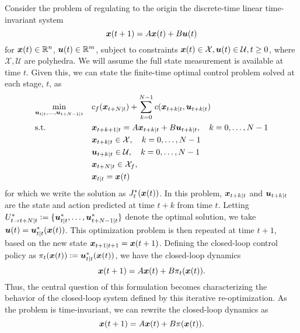 Consider the problem of regulating to the origin the discrete-time linear time-invariant system
\begin{equation}
    \bm{x}(t+1) = A \bm{x}(t) + B \bm{u}(t)
\end{equation}
for $\bm{x}(t) \in \mathbb{R}^n$, $\bm{u}(t) \in \mathbb{R}^m$, subject to constraints $\bm{x}(t) \in \mathcal{X}, \bm{u}(t) \in \mathcal{U}, t \geq 0$, where $\mathcal{X}, \mathcal{U}$ are polyhedra. We will assume the full state measurement is available at time $t$. 
Given this, we can state the finite-time optimal control problem solved at each stage, $t$, as 
\begin{equation}
\begin{aligned}
\label{eq:ocp}
& \underset{\bm{u}_{t\mid t}, \ldots, \bm{u}_{t+N-1\mid t}}{\min} & & c_f(\bm{x}_{t+N\mid t}) + \sum_{k=0}^{N-1} c(\bm{x}_{t+k\mid t},\bm{u}_{t+k\mid t})  \\
& \textrm{s.t.} & & \bm{x}_{t+k+1\mid t} = A \bm{x}_{t+k\mid t} + B \bm{u}_{t+k\mid t}, \quad k = 0, \ldots, N-1 \\
& & & \bm{x}_{t+k\mid t} \in \mathcal{X},  \quad k = 0, \ldots, N-1 \\
& & & \bm{u}_{t+k\mid t} \in \mathcal{U},  \quad k = 0, \ldots, N-1 \\
& & & \bm{x}_{t+N\mid t} \in \mathcal{X}_f, \\
& & & \bm{x}_{t\mid t} = \bm{x}(t)
\end{aligned}
\end{equation}
for which we write the solution as $J_t^*(\bm{x}(t))$. In this problem, $\bm{x}_{t+k\mid t}$ and $\bm{u}_{t+k\mid t}$ are the state and action predicted at time $t+k$ from time $t$. Letting $U^*_{t\to t+N\mid t} \vcentcolon= \{\bm{u}^*_{t\mid t}, \ldots, \bm{u}^*_{t+N-1\mid t}\}$ denote the optimal solution, we take $\bm{u}(t) = \bm{u}^*_{t\mid t}(\bm{x}(t))$. This optimization problem is then repeated at time $t+1$, based on the new state $\bm{x}_{t+1\mid t+1} = \bm{x}(t+1)$. Defining the closed-loop control policy as $\pi_t(\bm{x}(t)) \vcentcolon= \bm{u}^*_{t\mid t}(\bm{x}(t))$, we have the closed-loop dynamics 
\begin{equation}
    \bm{x}(t+1) = A \bm{x}(t) + B \pi_t(\bm{x}(t)).
\end{equation}
Thus, the central question of this formulation becomes characterizing the behavior of the closed-loop system defined by this iterative re-optimization. As the problem is time-invariant, we can rewrite the closed-loop dynamics as
\begin{equation}
    \bm{x}(t+1) = A \bm{x}(t) + B \pi(\bm{x}(t)).
\end{equation}


